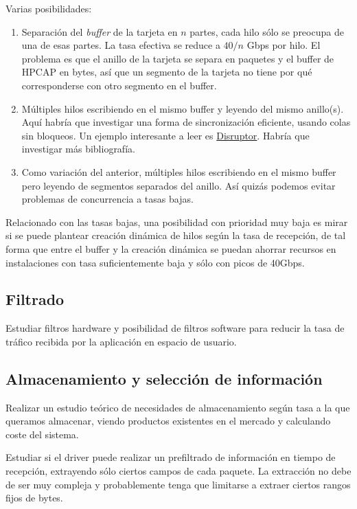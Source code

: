 \documentclass[oneside, draft]{epstfg}
\begin{document}
Varias posibilidades:

\begin{enumerate}
\item Separación del \textit{buffer} de la tarjeta en $n$ partes, cada hilo sólo se preocupa de una de esas partes. La tasa efectiva se reduce a $40 / n$ Gbps por hilo. El problema es que el anillo de la tarjeta se separa en paquetes y el buffer de HPCAP en bytes, así que un segmento de la tarjeta no tiene por qué corresponderse con otro segmento en el buffer.
\item Múltiples hilos escribiendo en el mismo buffer y leyendo del mismo anillo(s). Aquí habría que investigar una forma de sincronización eficiente, usando colas sin bloqueos. Un ejemplo interesante a leer es \href{http://disruptor.googlecode.com/files/Disruptor-1.0.pdf}{Disruptor}. Habría que investigar más bibliografía.
\item Como variación del anterior, múltiples hilos escribiendo en el mismo buffer pero leyendo de segmentos separados del anillo. Así quizás podemos evitar problemas de concurrencia a tasas bajas.
\end{enumerate}

Relacionado con las tasas bajas, una posibilidad con prioridad muy baja es mirar si se puede plantear creación dinámica de hilos según la tasa de recepción, de tal forma que entre el buffer y la creación dinámica se puedan ahorrar recursos en instalaciones con tasa suficientemente baja y sólo con picos de 40Gbps.

\subsection{Filtrado}

Estudiar filtros hardware y posibilidad de filtros software para reducir la tasa de tráfico recibida por la aplicación en espacio de usuario.

\subsection{Almacenamiento y selección de información}

Realizar un estudio teórico de necesidades de almacenamiento según tasa a la que queramos almacenar, viendo productos existentes en el mercado y calculando coste del sistema.

Estudiar si el driver puede realizar un prefiltrado de información en tiempo de recepción, extrayendo sólo ciertos campos de cada paquete. La extracción no debe de ser muy compleja y probablemente tenga que limitarse a extraer ciertos rangos fijos de bytes.
\end{document}
